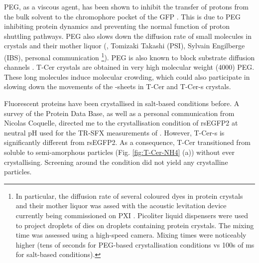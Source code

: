 PEG, as a viscous agent, has been shown to inhibit the transfer of protons from the bulk solvent to the chromophore pocket of the GFP \parencite{saxenaProteinDynamicsControl2005}. This is due to PEG inhibiting protein dynamics and preventing the normal function of proton shuttling pathways. PEG also slows down the diffusion rate of small molecules in crystals and their mother liquor (\cite{makinenReactivityCryoenzymologyEnzymes1977}, Tomizaki Takashi (PSI), Sylvain Engilberge (IBS), personal communication \footnote{In particular, the diffusion rate of several coloured dyes in protein crystals and their mother liquor was assed with the acoustic levitation device currently being commissioned on PXI \parencite{tsujinoUltrasonicAcousticLevitation2016,kepaAcousticLevitationRotation2022}. Picoliter liquid dispensers were used to project droplets of dies on droplets containing protein crystals. The mixing time was assessed using a high-speed camera. Mixing times were noticeably higher (tens of seconds for PEG-based crystallisation conditions vs 100s of ms for salt-based conditions).}). PEG is also known to block substrate diffusion channels \parencite{barrettInsightsRedoxPartner2004}. T-Cer crystals are obtained in very high molecular weight (4000) PEG. These long molecules induce molecular crowding, which could also participate in slowing down the movements of the \textbeta-sheets in T-Cer and T-Cer-s crystals. 

Fluorescent proteins have been crystallised in salt-based conditions before. A survey of the Protein Data Base, as well as a personal communication from Nicolas Coquelle, directed me to the crystallisation condition of rsEGFP2 at neutral pH used for the TR-SFX measurements of \cite{coquelleChromophoreTwistingExcited2018}. However, T-Cer-s is significantly different from rsEGFP2. As a consequence, T-Cer transitioned from soluble to semi-amorphous particles (Fig. \ref{fig:T-Cer-NH4} (a)) without ever crystallising. Screening around the condition did not yield any crystalline particles. 

